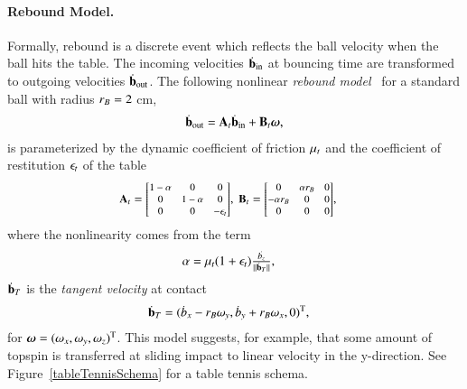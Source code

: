 \paragraph{Rebound Model.} Formally, rebound is a discrete event which reflects the ball velocity when the ball hits the table. The incoming velocities  $\dot{\boldsymbol{\mathrm{b}}}_{\mathrm{in}}$ at bouncing time are transformed to outgoing velocities $\dot{\boldsymbol{\mathrm{b}}}_{\mathrm{out}}$. The following nonlinear \emph{rebound model}~\citep{Nakashima10} for a standard ball with radius $r_{B} = 2$ cm,
%
\begin{align}
\dot{\boldsymbol{\mathrm{b}}}_{\mathrm{out}} = \boldsymbol{\mathrm{A}}_t\dot{\boldsymbol{\mathrm{b}}}_{\mathrm{in}} + \boldsymbol{\mathrm{B}}_t\boldsymbol{\mathrm{\omega}},
\label{reboundModel}
\end{align}
%
\noindent is parameterized by the dynamic coefficient of friction $\mu_t$ and the coefficient of restitution $\epsilon_t$ of the table
%
\begin{align}
\scalemath{0.9}{\bounce} &= \scalemath{0.8}{\begin{bmatrix}
1 - \alpha & 0 & 0 \\
0 & 1 - \alpha & 0 \\
0 & 0 & -\coeffRestitutionTable
\end{bmatrix}} , \
\scalemath{0.9}{\bounceSpin} = \scalemath{0.8}{\begin{bmatrix}
0 & \alpha\ballRadius & 0 \\
-\alpha\ballRadius & 0 & 0 \\
0 & 0 & 0
\end{bmatrix}},
\end{align}
%
\noindent where the nonlinearity comes from the term
%
\begin{align}
\alpha &= \mu_t(1 + \epsilon_t)\tfrac{\dot{b_z}}{\|\dot{\boldsymbol{\mathrm{b}}}_T\|},
\end{align}
%
\noindent $\dot{\boldsymbol{\mathrm{b}}}_T$ is the \emph{tangent velocity} at contact
%
\begin{align}
\dot{\boldsymbol{\mathrm{b}}}_T &= (\dot{b}_x - r_{B} \omega_y, \dot{b}_y + r_{B} \omega_x, 0)^{\mathrm{T}},
\end{align}
%
\noindent for $\boldsymbol{\mathrm{\omega}} = (\omega_x, \omega_y, \omega_z)^{\mathrm{T}}$. This model suggests, for example, that some amount of topspin is transferred at sliding impact to linear velocity in the y-direction. See Figure~\ref{tableTennisSchema} for a table tennis schema. 

